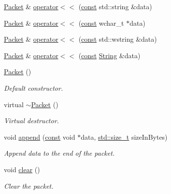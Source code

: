 \begin{DoxyCompactItemize}
\item 
\hyperlink{classsf_1_1_packet}{Packet} \& \hyperlink{classsf_1_1_packet_a59a21671caaa69da5d47c54b50e1eb54}{operator$<$$<$} (\hyperlink{term__entry_8h_a57bd63ce7f9a353488880e3de6692d5a}{const} std\-::string \&data)
\item 
\hyperlink{classsf_1_1_packet}{Packet} \& \hyperlink{classsf_1_1_packet_a6f7c6a9ce795fac342ea937896d98016}{operator$<$$<$} (\hyperlink{term__entry_8h_a57bd63ce7f9a353488880e3de6692d5a}{const} wchar\-\_\-t $\ast$data)
\item 
\hyperlink{classsf_1_1_packet}{Packet} \& \hyperlink{classsf_1_1_packet_a9f3401d038470f629d0c2c6be928a14b}{operator$<$$<$} (\hyperlink{term__entry_8h_a57bd63ce7f9a353488880e3de6692d5a}{const} std\-::wstring \&data)
\item 
\hyperlink{classsf_1_1_packet}{Packet} \& \hyperlink{classsf_1_1_packet_abc17272df082a36b202e10045bd9e220}{operator$<$$<$} (\hyperlink{term__entry_8h_a57bd63ce7f9a353488880e3de6692d5a}{const} \hyperlink{classsf_1_1_string}{String} \&data)
\item 
\hyperlink{classsf_1_1_packet_a786e5d4ced83992ceefa1799963ea858}{Packet} ()
\begin{DoxyCompactList}\small\item\em Default constructor. \end{DoxyCompactList}\item 
virtual \hyperlink{classsf_1_1_packet_adc0490ca3c7c3d1e321bd742e5213913}{$\sim$\-Packet} ()
\begin{DoxyCompactList}\small\item\em Virtual destructor. \end{DoxyCompactList}\item 
void \hyperlink{classsf_1_1_packet_a7dd6e429b87520008326c4d71f1cf011}{append} (\hyperlink{term__entry_8h_a57bd63ce7f9a353488880e3de6692d5a}{const} void $\ast$data, \hyperlink{nc__alloc_8h_a7b60c5629e55e8ec87a4547dd4abced4}{std\-::size\-\_\-t} size\-In\-Bytes)
\begin{DoxyCompactList}\small\item\em Append data to the end of the packet. \end{DoxyCompactList}\item 
void \hyperlink{classsf_1_1_packet_a133ea8b8fe6e93c230f0d79f19a3bf0d}{clear} ()
\begin{DoxyCompactList}\small\item\em Clear the packet. \end{DoxyCompactList}\item 

\end{DoxyCompactItemize}
